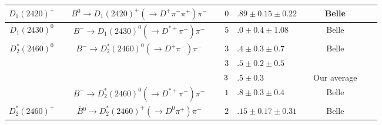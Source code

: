 \begin{adjustbox}{width=\textwidth,center}
{\begin{tabular}{cp{5pt}cp{5pt}r@{}lp{5pt}cp{5pt}c}
		\multirow{1}{*}{$D_{1}^{}(2420)^{+}$}      &   & \multirow{1}{*}{$\overline{B}{}^{0}\to D_{1}(2420)^{+}(\to D^{+}\pi^{-}\pi^{+})\pi^{-}$} & \cellcolor{LightGray} & \cellcolor{LightGray} $0$            & \cellcolor{LightGray}$.89\pm0.15\pm0.22$        & \cellcolor{LightGray} & \cellcolor{LightGray} Belle   & \cellcolor{LightGray} & \cite{Abe:2004sm}    \\ \midrule
		\multirow{1}{*}{$D_{1}(2430)^{0}$}           &   & $B^{-}\to D_{1}(2430)^{0}(\to D^{*+}\pi^{-})\pi^{-}$                                     & \cellcolor{LightGray} & \cellcolor{LightGray}$5$             & \cellcolor{LightGray}$.0\pm0.4\pm1.08$          & \cellcolor{LightGray} & \cellcolor{LightGray} Belle   & \cellcolor{LightGray} & \cite{Abe:2003zm}    \\ \midrule
		\multirow{4}{*}[-5pt]{$D_{2}^{*}(2460)^{0}$} &   & \multirow{3}{*}{$B^{-}\to D_{2}^{*}(2460)^{0}(\to D^{+}\pi^{-})\pi^{-}$}                 &                       & $3$                                  & $.4\pm0.3\pm0.7$                                &                       & Belle                         &                       & \cite{Abe:2003zm}    \\ 
		                                             &   &                                                                                          &                       & $3$                                  & $.5\pm0.2\pm0.5$                                &                       & \babar{}                      &                       & \cite{Aubert:2009wg} \\ \cmidrule{4-9}
		                                             &   &                                                                                          & \cellcolor{Gray}      & \cellcolor{Gray} $3\cellcolor{Gray}$ & \cellcolor{Gray}$.5 \pm 0.3$                    & \cellcolor{Gray}      & \cellcolor{Gray}  Our average & \cellcolor{Gray}      &                      \\ \cmidrule{3-9}
		                                             &   & \multirow{1}{*}{$B^{-}\to D_{2}^{*}(2460)^{0}(\to D^{*+}\pi^{-})\pi^{-}$}                & \cellcolor{LightGray} & \cellcolor{LightGray} $1$            & \cellcolor{LightGray}$.8\pm0.3\pm0.4$           & \cellcolor{LightGray} & \cellcolor{LightGray} Belle   & \cellcolor{LightGray} & \cite{Abe:2003zm}    \\ \midrule
		\multirow{1}{*}{$D_{2}^{*}(2460)^{+}$}     &   & \multirow{1}{*}{$\overline{B}{}^{0}\to D_{2}^{*}(2460)^{+}(\to D^{0}\pi^{+})\pi^{-}$}    & \cellcolor{LightGray} & \cellcolor{LightGray} $2$            & \cellcolor{LightGray}$.15\pm0.17\pm0.31$        & \cellcolor{LightGray} & \cellcolor{LightGray} Belle   & \cellcolor{LightGray} & \cite{Kuzmin:2006mw} \\	\bottomrule	
	\end{tabular}
}
\end{adjustbox}
